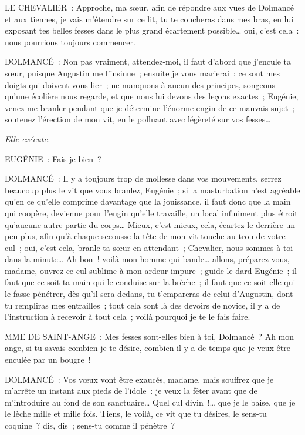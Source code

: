 \documentclass[french,twoside]{book} %
\begin{document}
LE CHEVALIER : Approche, ma sœur, afin de répondre aux vues de Dolmancé et aux tiennes, je vais m’étendre sur ce lit, tu te coucheras dans mes bras, en lui exposant tes belles fesses dans le plus grand écartement possible… oui, c’est cela : nous pourrions toujours commencer.\par
DOLMANCÉ : Non pas vraiment, attendez-moi, il faut d’abord que j’encule ta sœur, puisque Augustin me l’insinue ; ensuite je vous marierai : ce sont mes doigts qui doivent vous lier ; ne manquons à aucun des principes, songeons qu’une écolière nous regarde, et que nous lui devons des leçons exactes ; Eugénie, venez me branler pendant que je détermine l’énorme engin de ce mauvais sujet ; soutenez l’érection de mon vit, en le polluant avec légèreté sur vos fesses…\par
{\itshape Elle exécute.}\par
EUGÉNIE : Fais-je bien ?\par
DOLMANCÉ : Il y a toujours trop de mollesse dans vos mouvements, serrez beaucoup plus le vit que vous branlez, Eugénie ; si la masturbation n’est agréable qu’en ce qu’elle comprime davantage que la jouissance, il faut donc que la main qui coopère, devienne pour l’engin qu’elle travaille, un local infiniment plus étroit qu’aucune autre partie du corps… Mieux, c’est mieux, cela, écartez le derrière un peu plus, afin qu’à chaque secousse la tête de mon vit touche au trou de votre cul ; oui, c’est cela, branle ta sœur en attendant ; Chevalier, nous sommes à toi dans la minute… Ah bon ! voilà mon homme qui bande… allons, préparez-vous, madame, ouvrez ce cul sublime à mon ardeur impure ; guide le dard Eugénie ; il faut que ce soit ta main qui le conduise sur la brèche ; il faut que ce soit elle qui le fasse pénétrer, dès qu’il sera dedans, tu t’empareras de celui d’Augustin, dont tu rempliras mes entrailles ; tout cela sont là des devoirs de novice, il y a de l’instruction à recevoir à tout cela ; voilà pourquoi je te le fais faire.\par
MME DE SAINT-ANGE : Mes fesses sont-elles bien à toi, Dolmancé ? Ah mon ange, si tu savais combien je te désire, combien il y a de temps que je veux être enculée par un bougre !\par
DOLMANCÉ : Vos vœux vont être exaucés, madame, mais souffrez que je m’arrête un instant aux pieds de l’idole : je veux la fêter avant que de m’introduire au fond de son sanctuaire… Quel cul divin !… que je le baise, que je le lèche mille et mille fois. Tiens, le voilà, ce vit que tu désires, le sens-tu coquine ? dis, dis ; sens-tu comme il pénètre ?\par
\end{document}
